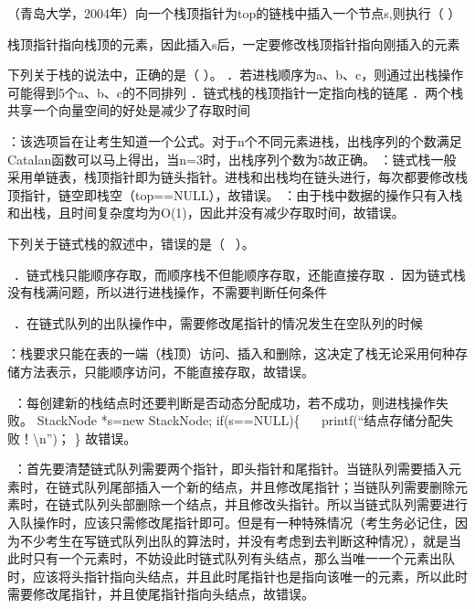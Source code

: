 \question （青岛大学，2004年）向一个栈顶指针为top的链栈中插入一个节点s,则执行（ ）
\par{}
\begin{solution}栈顶指针指向栈顶的元素，因此插入s后，一定要修改栈顶指针指向刚插入的元素
\end{solution}
\question 下列关于栈的说法中，正确的是（ ）。
．若进栈顺序为a、b、c，则通过出栈操作可能得到5个a、b、c的不同排列
．链式栈的栈顶指针一定指向栈的链尾
．两个栈共享一个向量空间的好处是减少了存取时间
\par{}
\begin{solution}：该选项旨在让考生知道一个公式。对于n个不同元素进栈，出栈序列的个数满足Catalan函数可以马上得出，当n=3时，出栈序列个数为5故正确。
：链式栈一般采用单链表，栈顶指针即为链头指针。进栈和出栈均在链头进行，每次都要修改栈顶指针，链空即栈空（top==NULL），故错误。
：由于栈中数据的操作只有入栈和出栈，且时间复杂度均为O(1)，因此并没有减少存取时间，故错误。
\end{solution}
\question 下列关于链式栈的叙述中，错误的是（ ~）。

~．链式栈只能顺序存取，而顺序栈不但能顺序存取，还能直接存取
．因为链式栈没有栈满问题，所以进行进栈操作，不需要判断任何条件

~．在链式队列的出队操作中，需要修改尾指针的情况发生在空队列的时候
\par{}
\begin{solution}：栈要求只能在表的一端（栈顶）访问、插入和删除，这决定了栈无论采用何种存储方法表示，只能顺序访问，不能直接存取，故错误。

~：每创建新的栈结点时还要判断是否动态分配成功，若不成功，则进栈操作失败。
StackNode *s=new StackNode; if(s==NULL)\{ ~
~printf(``结点存储分配失败！\textbackslash{}n'')； \} 故错误。

~：首先要清楚链式队列需要两个指针，即头指针和尾指针。当链队列需要插入元素时，在链式队列尾部插入一个新的结点，并且修改尾指针；当链队列需要删除元素时，在链式队列头部删除一个结点，并且修改头指针。所以当链式队列需要进行入队操作时，应该只需修改尾指针即可。但是有一种特殊情况（考生务必记住，因为不少考生在写链式队列出队的算法时，并没有考虑到去判断这种情况），就是当此时只有一个元素时，不妨设此时链式队列有头结点，那么当唯一一个元素出队时，应该将头指针指向头结点，并且此时尾指针也是指向该唯一的元素，所以此时需要修改尾指针，并且使尾指针指向头结点，故错误。
\end{solution}

